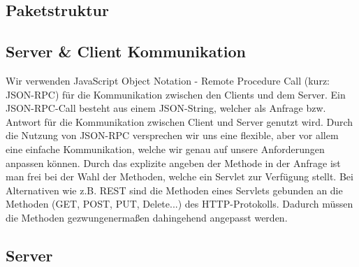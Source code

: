 	\subsection{Paketstruktur}
	\begin {center}
\end {center}
	\subsection{Server \& Client Kommunikation}

	Wir verwenden JavaScript Object Notation - Remote Procedure Call (kurz: JSON-RPC) für die Kommunikation zwischen den Clients und dem Server.
	Ein JSON-RPC-Call besteht aus einem JSON-String, welcher als Anfrage bzw. Antwort für die Kommunikation zwischen Client und Server genutzt wird.
	Durch die Nutzung von JSON-RPC versprechen wir uns eine flexible, aber vor allem eine einfache Kommunikation, welche wir genau auf unsere Anforderungen anpassen können.
Durch das explizite angeben der Methode in der Anfrage ist man frei bei der Wahl der Methoden, welche ein Servlet zur Verfügung stellt. Bei Alternativen wie z.B. REST sind die Methoden eines Servlets gebunden an die Methoden (GET, POST, PUT, Delete...) des HTTP-Protokolls. Dadurch müssen die Methoden gezwungenermaßen dahingehend angepasst werden.

	
	\subsection{Server}

